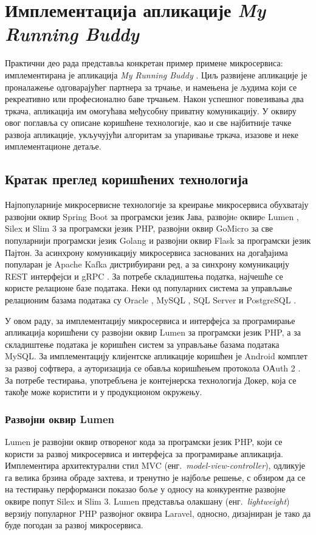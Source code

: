 \documentclass[12pt,oneside]{memoir}
\begin{document}
\chapter{Имплементација апликације \textit{My Running Buddy}}\label{prakticnideo}
Практични део рада представља конкретан пример примене микросервиса: имплементирана је апликација \textit{My Running Buddy} \cite{implementacija}. Циљ развијене апликације је проналажење одговарајућег партнера за трчање, и намењена је људима који се рекреативно или професионално баве трчањем. Након успешног повезивања два тркача, апликација им омогућава међусобну приватну комуникацију. У оквиру овог поглавља су описане коришћене технологије, као и све најбитније тачке развоја апликације, укључујући алгоритам за упаривање тркача, изазове и неке имплементационе детаље.

\section{Кратак преглед коришћених технологија}
Најпопуларније микросервисне технологије за креирање микросервиса обухватају развојни оквир Spring Boot \cite{SpringBoot} за програмски језик Јава, развојнe оквирe Lumen \cite{Lumen}, Silex \cite{Silex} и Slim 3 \cite{Slim3} за програмски језик PHP, развојни оквир GoMicro \cite{GoMicro} за све популарнији програмски језик Golang и развојни оквир Flask \cite{Flask} за програмски језик Пајтон. За асинхрону комуникацију микросервиса заснованих на догађајима популаран је Apache Kafka \cite{Kafka} дистрибуирани ред, а за синхрону комуникацију REST интерфејси и gRPC \cite{gRPC}. За потребе складиштења податка, најчешће се користе релационе базе података. Неки од популарних система за управљање релационим базама података су Oracle \cite{oracledbms}, MySQL \cite{mysql}, SQL Server \cite{sqlserver} и PostgreSQL \cite{postgresql}.

У овом раду, за имплементацију микросервиса и интерфејса за програмирање апликација коришћени су развојни оквир Lumen за програмски језик PHP, а за складиштење података је коришћен систем за управљање базама података MySQL. За имплементацију клијентске апликације коришћен је Android комплет за развој софтвера, а ауторизација се обавља коришћењем протокола OАuth 2 \cite{MasteringOAuth2}. За потребе тестирања, употребљена је контејнерска технологија Докер, која се такође може користити и у продукционом окружењу.

\subsection{Развојни оквир Lumen}
Lumen је развојни оквир отвореног кода за програмски језик PHP, који се користи за развој микросервиса и интерфејса за програмирање апликација. Имплементира архитектурални стил MVC (енг.~\textit{model-view-controller}), одликује га велика брзина обраде захтева, и тренутно је најбоље решење, с обзиром да се на тестирању перформанси показао боље у односу на конкурентне развојне оквире попут Silex и Slim 3. Lumen представља олакшану (енг.~\textit{lightweight}) верзију популарног PHP развојног оквира Laravel, односно, дизајниран је тако да буде погодан за развој микросервиса.
\end{document}

